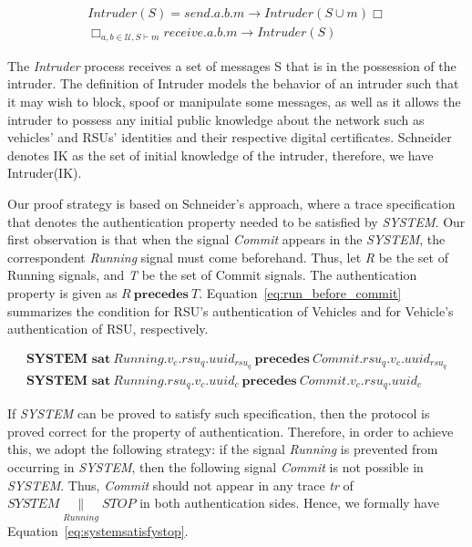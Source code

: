 \documentclass[preprint,12pt]{elsarticle}
\begin{document}
\begin{equation}
\begin{split}
Intruder(S) = send.a.b.m \rightarrow Intruder(S \cup {m}) \Box \\  \Box_{a, b \in \mathcal{U}, S \vdash m} receive.a.b.m \rightarrow Intruder(S)
\end{split}
\end{equation}

The \textit{Intruder} process receives a set of messages S that is in the possession of the intruder. The definition of Intruder models the behavior of an intruder such that it may wish to block, spoof or manipulate some messages, as well as it allows the intruder to possess any initial public knowledge about the network such as vehicles' and RSUs' identities and their respective digital certificates. Schneider denotes IK as the set of initial knowledge of the intruder, therefore, we have Intruder(IK).

Our proof strategy is based on Schneider's approach, where a trace specification that denotes the authentication property needed to be satisfied by \textit{SYSTEM}. Our first observation is that when the signal \textit{Commit} appears in the \textit{SYSTEM}, the correspondent \textit{Running} signal must come beforehand. Thus, let \textit{R} be the set of Running signals, and \textit{T} be the set of Commit signals. The authentication property is given as $R~\textbf{precedes}~T$. Equation~\ref{eq:run_before_commit} summarizes the condition for RSU's authentication of Vehicles and for Vehicle's authentication of RSU, respectively.

\begin{equation}
\begin{split}
\label{eq:run_before_commit}
\textbf{SYSTEM sat}~Running.v_{c}.rsu_{q}.uuid_{rsu_{q}}~\textbf{precedes}~Commit.rsu_{q}.v_{c}.uuid_{rsu_{q}}\\
\textbf{SYSTEM sat}~Running.rsu_{q}.v_{c}.uuid_{c}~\textbf{precedes}~Commit.v_{c}.rsu_{q}.uuid_{c}
\end{split}
\end{equation}

If \textit{SYSTEM} can be proved to satisfy such specification, then the protocol is proved correct for the property of authentication. Therefore, in order to achieve this, we adopt the following strategy: if the signal \textit{Running} is prevented from occurring in \textit{SYSTEM}, then the following signal \textit{Commit} is not possible in \textit{SYSTEM}. Thus, \textit{Commit} should not appear in any trace \textit{tr} of $SYSTEM \underset{Running}{\|} STOP$ in both authentication sides. Hence, we formally have Equation~\ref{eq:systemsatisfystop}.
\end{document}
